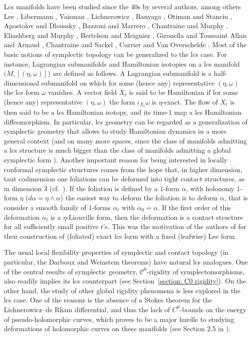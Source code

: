 \documentclass{amsart}
\theoremstyle{remark}
\begin{document}
Lcs manifolds have been studied since the 40s
by several authors,
among others Lee \cite{Lee}, Libermann \cite{Libermann},
Vaisman \cite{Vaisman 76, Vaisman},
Lichnerowicz \cite{Lich},
Banyaga \cite{Banyaga lcs},
Otiman and Stanciu \cite{OS},
Apostolov and Dloussky \cite{AD, AD18},
Bazzoni and Marrero \cite{BaM}, Chantraine and Murphy \cite{CM},
Eliashberg and Murphy \cite{EM},
Bertelson and Meigniez \cite{BM},
Gironella and Toussaint \cite{GT}
Allais and Arnaud \cite{AA},
Chantraine and Sackel \cite{CS},
Currier \cite{Currier, Currier 2}
and Van Overschelde \cite{VOa, VOb}.
Most of the basic notions of symplectic topology
can be generalized to the lcs case.
For instance,
Lagrangian submanifolds and Hamiltonian isotopies
on a lcs manifold $\big( M , [(\eta, \omega)] \big)$
are defined as follows.
A Lagrangian submanifold
is a half-dimensional submanifold
on which for some (hence any) representative $(\eta, \omega)$
the lcs form $\omega$ vanishes.
A vector field $X_t$ is said to be Hamiltonian
if for some (hence any) representative $(\eta, \omega)$
the form $\iota_{X_t}\omega$ is $\eta$-exact. 
The flow of $X_t$ is then said
to be a lcs Hamiltonian isotopy,
and its time-$1$ map a lcs Hamiltonian diffeomorphism.
In particular,
lcs geometry can be regarded as a generalization of symplectic geometry
that allows to study Hamiltonian dynamics in a more general context
(and on many more spaces,
since the class of manifolds admitting a lcs structure
is much bigger than the class of manifolds
admitting a global symplectic form
\cite{EM, BM}).
Another important reason for being interested in locally conformal symplectic structures comes from the hope that, in higher dimension, taut codimension one foliations can be deformed into tight contact structures, as in dimension 3 (cf.\ \cite{ET}). If the foliation is defined by a $1$-form $\alpha$, with holonomy $1$-form $\eta$ ($d\alpha = \eta \wedge \alpha$) the easiest way to deform the foliation is to deform $\alpha$, that is consider a smooth family of $1$-forms $\alpha_t$ with $\alpha_0 = \alpha$. If the first order of this deformation $\dot{\alpha}_t$ is a $\eta$-Liouville form, then the deformation is a contact structure for all sufficiently small positive $t$'s. This was the motivation of the authors of \cite{BM} for their construction of (foliated) exact lcs form with a fixed (leafwise) Lee form.

The usual local flexibility properties of symplectic and contact topology
(in particular, the Darboux and Weinstein theorems)
have natural lcs analogues.
One of the central results of symplectic geometry,
$\mathcal{C}^0$-rigidity of symplectomorphisms,
also readily implies its lcs counterpart 
(see Section~\ref{section: C0 rigidity}).
On the other hand,
the study of other global rigidity phenomena
is less explored in the lcs case.
One of the reasons is 
the absence of a Stokes theorem for the Lichnerowicz--de Rham differential,
and thus the lack of $C^0$-bounds on the energy of pseudo-holomorphic curves,
which proves to be a major hurdle to studying deformations
of holomorphic curves on these manifolds
(see Section 2.5 in \cite{CM}).
\end{document}
